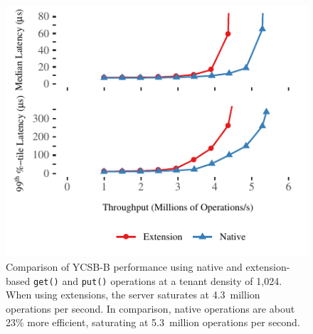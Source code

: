 \begin{figure}[t]
\centering
\includegraphics[width=1.0\columnwidth]{graphs/ycsb-open.pdf}
\caption{Comparison of YCSB-B performance using native and extension-based
	\texttt{get()} and \texttt{put()} operations at a tenant density
	of 1,024. When using extensions, the server saturates at
	4.3~million operations per second. In comparison, native
	operations are about 23\% more efficient, saturating at 5.3~million operations
	per second.}
\label{fig:open-load}
\end{figure}
